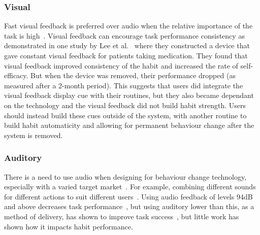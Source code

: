 \subsubsection{Visual}
Fast visual feedback is preferred over audio when the relative importance of the task is high~\cite{visual_mode_better}. Visual feedback can encourage task performance consistency as demonstrated in one study by Lee et al.~\cite{article_realtime_feedback_improving_medication_taking} where they constructed a device that gave constant visual feedback for patients taking medication. They found that visual feedback improved consistency of the habit and increased the rate of self-efficacy. But when the device was removed, their performance dropped (as measured after a 2-month period). This suggests that users did integrate the visual feedback display cue with their routines, but they also became dependant on the technology and the visual feedback did not build habit strength. Users should instead build these cues outside of the system, with another routine to build habit automaticity and allowing for permanent behaviour change after the system is removed.

\subsubsection{Auditory}
There is a need to use audio when designing for behaviour change technology, especially with a varied target market~\cite{article_designing_for_health_behaviour_change_hci}. For example, combining different sounds for different actions to suit different users~\cite{article_movipill_improving_medication_elders}. Using audio feedback of levels 94dB and above decreases task performance~\cite{high_audio_feedback_negative_performance}, but using auditory lower than this, as a method of delivery, has shown to improve task success~\cite{auditory_notifications_increase_delivery_success}, but little work has shown how it impacts habit performance.



